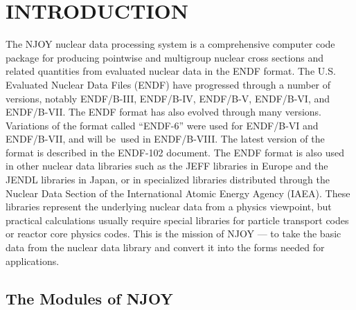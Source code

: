 \section{INTRODUCTION}
\label{sINTRO}

The NJOY nuclear data processing system\cite{NJ1,NJ2,NJOY91,NJ10,
NJ12,njoytutorial}
is a comprehensive computer code package for producing pointwise and
multigroup nuclear cross sections and related quantities from
evaluated nuclear data in the ENDF format.  The U.S. Evaluated
Nuclear Data Files (ENDF) have progressed through a number of
versions, notably ENDF/B-III, ENDF/B-IV, ENDF/B-V, ENDF/B-VI,
and ENDF/B-VII\cite{ENDF7,ENDF71}.  The ENDF format has also evolved
through many versions.  Variations of the format called
``ENDF-6'' were used for ENDF/B-VI and ENDF/B-VII, and will be\
used in ENDF/B-VIII.  The latest version of the format is
described in the ENDF-102 document\cite{ENDF102,endftutorial}.
The ENDF format is also used in other nuclear data
libraries such as the JEFF libraries in Europe and the JENDL libraries
in Japan, or in specialized libraries distributed through the Nuclear
Data Section of the International Atomic Energy Agency (IAEA).
These libraries represent the underlying nuclear data from a physics
viewpoint, but practical calculations usually require special
libraries for particle transport codes or reactor core physics codes.
This is the mission of NJOY --- to take the basic data from the nuclear
data library and convert it into the forms needed for applications.

\subsection{The Modules of NJOY}
\label{ssINTRO_Modules_of_NJOY}

